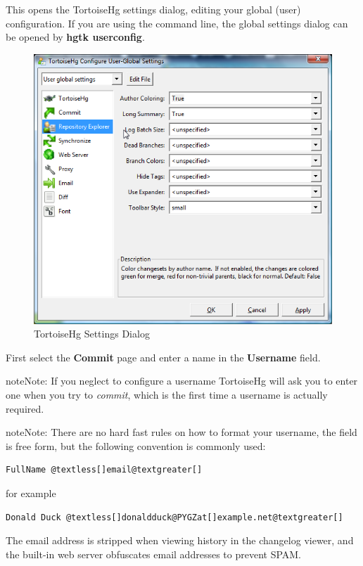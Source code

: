 \documentclass[letterpaper,10pt,english]{manual}
\begin{document}
This opens the TortoiseHg settings dialog, editing your global (user)
configuration.  If you are using the command line, the global settings
dialog can be opened by \textbf{hgtk userconfig}.
\begin{figure}[htbp]
\centering

\includegraphics{settings.png}
\caption{TortoiseHg Settings Dialog}\end{figure}

First select the \textbf{Commit} page and enter a name in the
\textbf{Username} field.

\begin{notice}{note}{Note:}
If you neglect to configure a username TortoiseHg will ask you to
enter one when you try to \emph{commit}, which is the first time a
username is actually required.
\end{notice}

\begin{notice}{note}{Note:}
There are no hard fast rules on how to format your username, the
field is free form, but the following convention is commonly used:

\begin{Verbatim}[commandchars=@\[\]]
FullName @textless[]email@textgreater[]
\end{Verbatim}

for example

\begin{Verbatim}[commandchars=@\[\]]
Donald Duck @textless[]donaldduck@PYGZat[]example.net@textgreater[]
\end{Verbatim}

The email address is stripped when viewing history in the changelog
viewer, and the built-in web server obfuscates email addresses to
prevent SPAM.
\end{notice}
\end{document}
